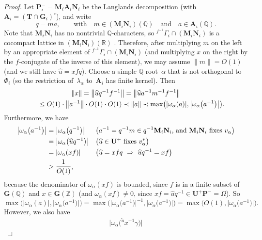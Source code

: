 \documentclass[pdftex]{sigma}
\newcommand{\QQ}{\mathbb{Q}}
\newcommand{\RR}{\mathbb{R}}
\newcommand{\ZZ}{\mathbb{Z}}
\newcommand{\Aa}{\mathbf{A}}
\newcommand{\Ga}{\mathbf{G}}
\newcommand{\Ma}{\mathbf{M}}
\newcommand{\Na}{\mathbf{N}}
\newcommand{\Pa}{\mathbf{P}}
\newcommand{\Ta}{\mathbf{T}}
\newcommand{\Ua}{\mathbf{U}}
\numberwithin{equation}{section}
\theoremstyle{definition}
\begin{document}
\begin{proof}
Let $\Pa_i^- = \Ma_i \Aa_i \Na_i$ be the Langlands decomposition (with $\Aa_i = (\Ta \cap \Ga_i)^\circ$), and write
	\[ q = ma, \qquad \text{with} \quad m \in (\Ma_i \Na_i)(\QQ) \quad \text{and} \quad a \in \Aa_i(\QQ) .\]
Note that $\Ma_i \Na_i$ has no nontrivial $\QQ$-characters, so ${}^{f^{-1}} \Gamma_i \cap (\Ma_i \Na_i)$ is a cocompact lattice in $(\Ma_i \Na_i)(\RR)$ \cite[Theorem~4.12, p.~210]{MR1278263}. Therefore, after multiplying $m$ on the left by an appropriate element of ${}^{f^{-1}} \Gamma_i \cap (\Ma_i \Na_i)$ (and multiplying $x$ on the right by the $f$-conjugate of the inverse of this element), we may assume $\| m \| = O(1)$ (and we still have $\widehat{u} = x f q$). Choose a simple $\QQ$-root~$\alpha$ that is not orthogonal to $\Phi_i$ (so the restriction of~$\lambda_\alpha$ to~$\Aa_i$ has finite kernel). Then
	\begin{gather*}
	\|x\| = \big\| \widehat{u} q^{-1} f^{-1}\big\|
	= \big\| \widehat{u} a^{-1} m^{-1} f^{-1}\big\|\\
\hphantom{\|x\|}{} \le O(1) \cdot \big\|a^{-1}\big\| \cdot O(1) \cdot O(1)
	\prec \|a\|
	\prec \max \bigl( |\omega_\alpha(a)|, \big|\omega_\alpha\big(a^{-1}\big)\big| \bigr)
	. \end{gather*}
Furthermore, we have
	\begin{align*}
	\big|\omega_\alpha\big(a^{-1}\big)\big|
	&=\big|\omega_\alpha\big(q^{-1}\big)\big|
		&& \text{\big($a^{-1} = q^{-1} m \in q^{-1} \Ma_i \Na_i$, and $\Ma_i \Na_i$ fixes~$v_\alpha$\big)}
	\\&=\big|\omega_\alpha\big(\widehat{u} q^{-1}\big)\big|
		&& \text{\big($\widehat{u} \in \Ua^+$ fixes $v_\alpha^*$\big)}
	\\&=|\omega_\alpha(x f)|
		&& \text{\big($\widehat{u} = x f q \ \Rightarrow \ \widehat{u} q^{-1} = x f$\big)}
	\\& > \frac{1}{O(1)}	,
\end{align*}
 because the denominator of $\omega_\alpha(x f)$ is bounded, since $f$ is in a finite subset of $\Ga(\QQ)$ and $x \in \Ga(\ZZ)$ (and $\omega_\alpha(x f)\neq 0$, since $x f = \widehat{u} q^{-1} \in \Ua^+ \Pa^- = \Omega$). So
	\[ \max \bigl( |\omega_\alpha(a)|, \big|\omega_\alpha\big(a^{-1}\big)\big| \bigr)
	= \max \bigl( \big|\omega_\alpha\big(a^{-1}\big)\big|^{-1}, \big|\omega_\alpha\big(a^{-1}\big)\big| \bigr)
	= \max \bigl( O(1), \big|\omega_\alpha\big(a^{-1}\big)\big| \bigr) .\]
However, we also have
	\begin{align*}
	\big| \omega_\alpha \big( {}^{\overleftarrow{u}} \! \! x^{-1} \gamma\big) \big|

\end{align*}
\end{proof}
\end{document}
